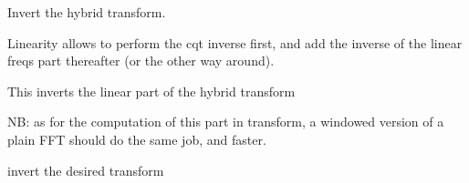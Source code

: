 \documentclass[letterpaper,10pt,english]{sphinxmanual}
\begin{document}
\begin{fulllineitems}
\begin{fulllineitems}
\end{fulllineitems}


\begin{fulllineitems}
\label{reference/tftransforms:pyfasst.tftransforms.minqt.HybridCQTransfo.invertHybridCQT}
Invert the hybrid transform.

Linearity allows to perform the cqt inverse first, and add the inverse
of the linear freqs part thereafter (or the other way around).

\end{fulllineitems}


\begin{fulllineitems}
\label{reference/tftransforms:pyfasst.tftransforms.minqt.HybridCQTransfo.invertLinearPart}
This inverts the linear part of the hybrid transform

NB: as for the computation of this part in transform, a windowed
version
of a plain FFT should do the same job, and faster.

\end{fulllineitems}


\begin{fulllineitems}
\label{reference/tftransforms:pyfasst.tftransforms.minqt.HybridCQTransfo.invertTransform}
invert the desired transform

\end{fulllineitems}


\end{fulllineitems}

\end{document}
